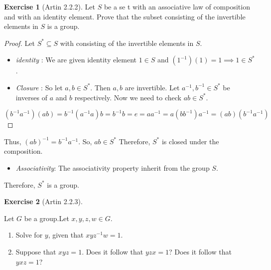 \documentclass[
]{book}
\providecommand{\tightlist}{%
  \setlength{\itemsep}{0pt}\setlength{\parskip}{0pt}}
\theoremstyle{definition}
\theoremstyle{definition}
\theoremstyle{definition}
\newtheorem{exercise}{Exercise}[chapter]
\theoremstyle{definition}
\theoremstyle{remark}
\begin{document}
\begin{exercise}[Artin 2.2.2]
\protect\hypertarget{exr:unnamed-chunk-90}{}\label{exr:unnamed-chunk-90}Let \(S\) be a se t with an associative law of composition and with an identity element. Prove that the subset consisting of the invertible elements in \(S\) is a group.
\end{exercise}

\begin{proof}
Let \(S^*\subseteq S\) with consisting of the invertible elements in \(S\).

\begin{itemize}
\item
  \emph{identity} : We are given identity element \(1 \in S\) and \((1^{-1})(1)=1 \implies 1 \in S^*\).
\item
  \emph{Closure} :
  So let \(a,b\in S^*\). Then \(a,b\) are invertible. Let \(a^{-1},b^{-1}\in S^*\) be inverses of \(a\) and \(b\) respectively. Now we need to check \(ab\in S^*\).\\
\end{itemize}

\[(b^{-1}a^{-1})(ab)=b^{-1}(a^{-1}a)b=b^{-1}b=e=
  aa^{-1}=a(bb^{-1})a^{-1}=(ab)(b^{-1}a^{-1})\]
\end{proof}

Thus, \((ab)^{-1}=b^{-1}a^{-1}\). So, \(ab\in S^*\)
Therefore, \(S^*\) is closed under the composition.

\begin{itemize}
\tightlist
\item
  \emph{Associativity}: The associativity property inherit from the group \(S\).
\end{itemize}

Therefore, \(S^*\) is a group.

\begin{exercise}[Artin 2.2.3]
\protect\hypertarget{exr:unnamed-chunk-92}{}\label{exr:unnamed-chunk-92}

Let \(G\) be a group.Let \(x, y, z,w \in G\).

\begin{enumerate}
\def\labelenumi{(\alph{enumi})}
\tightlist
\item
  Solve for \(y\), given that \(xyz^{-1}w = 1\).
\item
  Suppose that \(xyz = 1\). Does it follow that \(yzx = 1\)? Does it follow that \(yxz = 1\)?
\end{enumerate}

\end{exercise}
\end{document}
